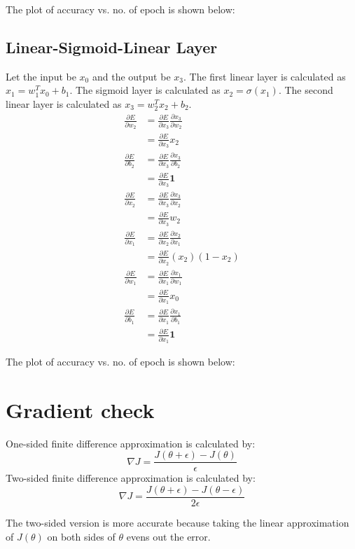 \documentclass[twoside,12pt]{article}
\begin{document}
The plot of accuracy vs. no. of epoch is shown below:

\subsection{Linear-Sigmoid-Linear Layer}

Let the input be $x_0$ and the output be $x_3$. The first linear layer is calculated as $x_1=w_1^Tx_0+b_1$.
The sigmoid layer is calculated as $x_2=\sigma(x_1)$.
The second linear layer is calculated as $x_3=w_2^Tx_2+b_2$.
\begin{equation}
\begin{split}
\frac{\partial E}{\partial w_2} &= \frac{\partial E}{\partial x_3} \frac{\partial x_3}{\partial w_2} \\
							    &= \frac{\partial E}{\partial x_3} x_2 \\
\frac{\partial E}{\partial b_2} &= \frac{\partial E}{\partial x_3} \frac{\partial x_3}{\partial b_2} \\
							    &= \frac{\partial E}{\partial x_3} \mathbf{1} \\
\frac{\partial E}{\partial x_2} &= \frac{\partial E}{\partial x_3} \frac{\partial x_3}{\partial x_2} \\
								&= \frac{\partial E}{\partial x_3} w_2 \\
\frac{\partial E}{\partial x_1} &= \frac{\partial E}{\partial x_2} \frac{\partial x_2}{\partial x_1} \\
							    &= \frac{\partial E}{\partial x_2} (x_2) (1-x_2) \\
\frac{\partial E}{\partial w_1} &= \frac{\partial E}{\partial x_1} \frac{\partial x_1}{\partial w_1} \\
							    &= \frac{\partial E}{\partial x_1} x_0 \\
\frac{\partial E}{\partial b_1} &= \frac{\partial E}{\partial x_1} \frac{\partial x_1}{\partial b_1} \\
							    &= \frac{\partial E}{\partial x_1} \mathbf{1} 
\end{split}
\end{equation}

The plot of accuracy vs. no. of epoch is shown below:

\section{Gradient check}

One-sided finite difference approximation is calculated by:
\begin{equation}
\nabla J = \frac{J(\theta + \epsilon) - J(\theta)}{\epsilon}
\end{equation}
Two-sided finite difference approximation is calculated by:
\begin{equation}
\nabla J = \frac{J(\theta + \epsilon) - J(\theta - \epsilon)}{2 \epsilon}
\end{equation}

The two-sided version is more accurate because taking the linear approximation of $J(\theta)$
on both sides of $\theta$ evens out the error.
\end{document}
